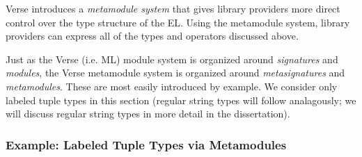 
Verse introduces a \emph{metamodule system} that gives library providers more direct control over the type structure of the EL. Using the metamodule system, library providers can express all of the types and operators discussed above.

Just as the Verse (i.e. ML) module system is organized around \emph{signatures} and \emph{modules}, the Verse metamodule system is organized around \emph{metasignatures} and \emph{metamodules}. These are most easily introduced by example. We consider only labeled tuple types in this section (regular string types will follow analagously; we will discuss regular string types in more detail in the dissertation).


\subsubsection{Example: Labeled Tuple Types via Metamodules}

